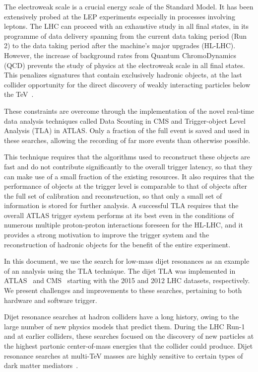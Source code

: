 \documentclass[a4paper,justified]{tufte-handout}
\begin{document}
The electroweak scale is a crucial energy scale of the Standard Model. It has been extensively probed at the LEP experiments especially in processes involving leptons. The LHC can proceed with an exhaustive study in all final states, in its programme of data delivery spanning from the current data taking period (Run 2) to the data taking period after the machine's major upgrades (HL-LHC).  However, the increase of background rates from Quantum ChromoDynamics (QCD) prevents the study of physics at the electroweak scale in all final states. This penalizes signatures that contain exclusively hadronic objects, at the last collider opportunity for the direct discovery of weakly interacting  particles below the TeV~\cite{Dobrescu:2013cmh}. 

These constraints are overcome through the implementation of the novel real-time data analysis techniques called Data Scouting in CMS and Trigger-object Level Analysis (TLA) in ATLAS. Only a fraction of the full event is saved and used in these searches, allowing the recording of far more events than otherwise possible. 

This technique requires that the algorithms used to reconstruct these objects are fast and do not contribute significantly to the overall trigger latency, so that they can make use of a small fraction of the existing resources. It also requires that the performance of objects at the trigger level is comparable to that of objects after the full set of calibration and reconstruction, so that only a small set of information is stored for further analysis. A successful TLA requires that the overall ATLAS trigger system performs at its best even in the conditions of numerous multiple proton-proton interactions foreseen for the HL-LHC, and it provides a strong motivation to improve the trigger system and the reconstruction of hadronic objects for the benefit of the entire experiment.

In this document, we use the search for low-mass dijet resonances as an example of an analysis using the TLA technique. The dijet TLA was implemented in ATLAS~\cite{ATLAS-CONF-2016-030} and CMS~\cite{Khachatryan:2016ecr} starting with the 2015 and 2012 LHC datasets, respectively. We present challenges and improvements to these searches, pertaining to both hardware and software trigger. 

Dijet resonance searches at hadron colliders have a long history, owing to the large number of new physics models that predict them. During the LHC Run-1 and at earlier colliders, these searches focused on the discovery of new particles at the highest partonic center-of-mass energies that the collider could produce. Dijet resonance searches at multi-TeV masses are highly sensitive to certain types of dark matter mediators~\cite{Abercrombie:2015wmb,Chala:2015ama}.
\end{document}
